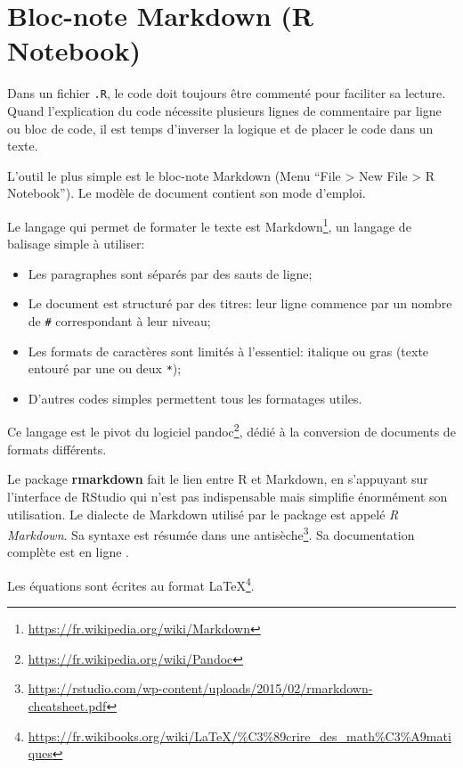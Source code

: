\documentclass[
  11pt,
  french,
  a4paper,
  extrafontsizes,onecolumn,openright
  ]{memoir}
\providecommand{\tightlist}{%
  \setlength{\itemsep}{0pt}\setlength{\parskip}{0pt}}
\begin{document}
\hypertarget{bloc-note-markdown-r-notebook}{%
\section{Bloc-note Markdown (R Notebook)}\label{bloc-note-markdown-r-notebook}}

Dans un fichier \texttt{.R}, le code doit toujours être commenté pour faciliter sa lecture.
Quand l'explication du code nécessite plusieurs lignes de commentaire par ligne ou bloc de code, il est temps d'inverser la logique et de placer le code dans un texte.

L'outil le plus simple est le bloc-note Markdown (Menu ``File \textgreater{} New File \textgreater{} R Notebook'').
Le modèle de document contient son mode d'emploi.

Le langage qui permet de formater le texte est Markdown\footnote{\url{https://fr.wikipedia.org/wiki/Markdown}}, un langage de balisage simple à utiliser:

\begin{itemize}
\tightlist
\item
  Les paragraphes sont séparés par des sauts de ligne;
\item
  Le document est structuré par des titres: leur ligne commence par un nombre de \texttt{\#} correspondant à leur niveau;
\item
  Les formats de caractères sont limités à l'essentiel: italique ou gras (texte entouré par une ou deux \texttt{*});
\item
  D'autres codes simples permettent tous les formatages utiles.
\end{itemize}

Ce langage est le pivot du logiciel pandoc\footnote{\url{https://fr.wikipedia.org/wiki/Pandoc}}, dédié à la conversion de documents de formats différents.

Le package \textbf{rmarkdown} \autocite{Xie2015} fait le lien entre R et Markdown, en s'appuyant sur l'interface de RStudio qui n'est pas indispensable mais simplifie énormément son utilisation.
Le dialecte de Markdown utilisé par le package est appelé \emph{R Markdown}.
Sa syntaxe est résumée dans une antisèche\footnote{\url{https://rstudio.com/wp-content/uploads/2015/02/rmarkdown-cheatsheet.pdf}}.
Sa documentation complète est en ligne \autocite{Xie2018}.

Les équations sont écrites au format LaTeX\footnote{\url{https://fr.wikibooks.org/wiki/LaTeX/\%C3\%89crire_des_math\%C3\%A9matiques}}.
\end{document}
